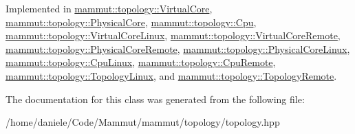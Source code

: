 Implemented in \hyperlink{classmammut_1_1topology_1_1VirtualCore_a94374b13113f0294c5178b6fc275ecc0}{mammut\-::topology\-::\-Virtual\-Core}, \hyperlink{classmammut_1_1topology_1_1PhysicalCore_ad6169b49eb4aa01fa570169735875ffe}{mammut\-::topology\-::\-Physical\-Core}, \hyperlink{classmammut_1_1topology_1_1Cpu_a3eea41d7ad6200d83301102f23944de5}{mammut\-::topology\-::\-Cpu}, \hyperlink{classmammut_1_1topology_1_1VirtualCoreLinux_a9091e0404bacb86772ee34c3c24e5713}{mammut\-::topology\-::\-Virtual\-Core\-Linux}, \hyperlink{classmammut_1_1topology_1_1VirtualCoreRemote_a43ea3102cdebec0ce6991b5638e3c4e2}{mammut\-::topology\-::\-Virtual\-Core\-Remote}, \hyperlink{classmammut_1_1topology_1_1PhysicalCoreRemote_a5f76fa7a3b9c61597ad06a2fce8db675}{mammut\-::topology\-::\-Physical\-Core\-Remote}, \hyperlink{classmammut_1_1topology_1_1PhysicalCoreLinux_a6c65161ad3041a8cedb8a9bc43757c02}{mammut\-::topology\-::\-Physical\-Core\-Linux}, \hyperlink{classmammut_1_1topology_1_1CpuLinux_ae22825c9a86f221c3ffe9c456dfe96aa}{mammut\-::topology\-::\-Cpu\-Linux}, \hyperlink{classmammut_1_1topology_1_1CpuRemote_a689af84ac46ab57081fc4fa47c9992b6}{mammut\-::topology\-::\-Cpu\-Remote}, \hyperlink{classmammut_1_1topology_1_1TopologyLinux_a8d33dfb6af9e8ec32c0501dbe7031809}{mammut\-::topology\-::\-Topology\-Linux}, and \hyperlink{classmammut_1_1topology_1_1TopologyRemote_a0544edb42fc7e88e23394d94929e4438}{mammut\-::topology\-::\-Topology\-Remote}.



The documentation for this class was generated from the following file\-:\begin{DoxyCompactItemize}
\item 
/home/daniele/\-Code/\-Mammut/mammut/topology/topology.\-hpp\end{DoxyCompactItemize}
